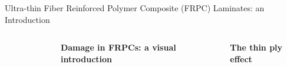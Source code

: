 \documentclass[final]{beamer}
\begin{document}
\begin{frame}
\begin{center}
\begin{minipage}{\textwidth}
\begin{block}{\rule[-0.6ex]{0pt}{50pt}\centering\LARGE Ultra-thin Fiber Reinforced Polymer Composite (FRPC) Laminates: an Introduction}
\begin{columns}
\begin{column}{0.4\textwidth}
\begin{center}
\begin{figure}[!h]
\end{figure}
\end{center}
\end{column}
\begin{column}{0.25\textwidth}  %
  \begin{center}
\textbf{Damage in FRPCs: a visual introduction}
\captionsetup[subfigure]{labelformat=empty}
\begin{figure}[!h]
\centering
     \\
\end{figure}
     \end{center}
\end{column}
\begin{column}{0.35\textwidth}  %
    \begin{center}
\textbf{The thin ply effect}


\end{center}
\end{column}
\end{columns}
\end{block}
\end{minipage}
\end{center}
\end{frame}
\end{document}
